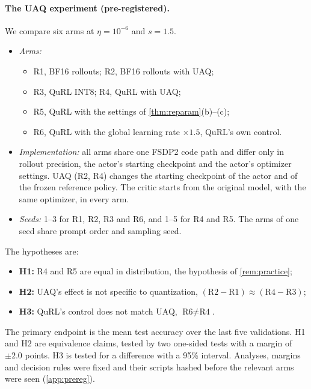 \paragraph{The UAQ experiment (pre-registered).} We compare six arms at $\eta=10^{-6}$ and $s=1.5$.
\begin{itemize}[leftmargin=*,itemsep=1pt]
\item \emph{Arms:}
  \begin{itemize}[leftmargin=*,itemsep=1pt]
  \item R1, BF16 rollouts; R2, BF16 rollouts with UAQ;
  \item R3, QuRL INT8; R4, QuRL with UAQ;
  \item R5, QuRL with the settings of \cref{thm:reparam}(b)--(c);
  \item R6, QuRL with the global learning rate $\times1.5$, QuRL's own control.
  \end{itemize}
\item \emph{Implementation:} all arms share one FSDP2 code path and differ only in rollout precision, the actor's starting checkpoint and the actor's optimizer settings. UAQ (R2, R4) changes the starting checkpoint of the actor and of the frozen reference policy. The critic starts from the original model, with the same optimizer, in every arm.
\item \emph{Seeds:} 1--3 for R1, R2, R3 and R6, and 1--5 for R4 and R5. The arms of one seed share prompt order and sampling seed.
\end{itemize}
The hypotheses are:
\begin{itemize}[leftmargin=*,itemsep=1pt]
\item \textbf{H1:} R4 and R5 are equal in distribution, the hypothesis of \cref{rem:practice};
\item \textbf{H2:} UAQ's effect is not specific to quantization, $(\text{R2}-\text{R1})\approx(\text{R4}-\text{R3})$;
\item \textbf{H3:} QuRL's control does not match UAQ, $\text{R6}\neq\text{R4}$.
\end{itemize}
The primary endpoint is the mean test accuracy over the last five validations. H1 and H2 are equivalence claims, tested by two one-sided tests with a margin of $\pm2.0$ points. H3 is tested for a difference with a 95\% interval. Analyses, margins and decision rules were fixed and their scripts hashed before the relevant arms were seen (\cref{app:prereg}).

